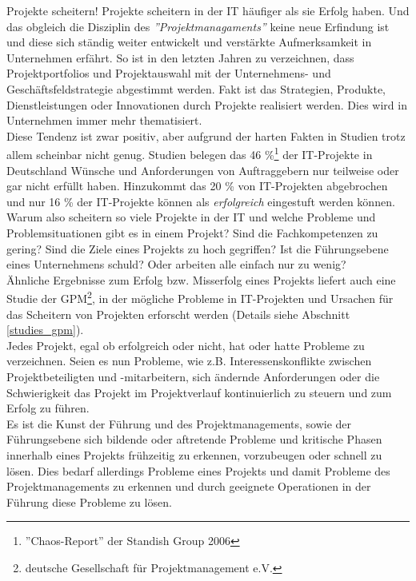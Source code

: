 \documentclass[12pt]{scrartcl}
\begin{document}
Projekte scheitern! Projekte scheitern in der IT häufiger als sie Erfolg haben. Und das obgleich die Disziplin des \textit{''Projektmanagaments''} keine neue Erfindung ist und diese sich ständig weiter entwickelt und verstärkte Aufmerksamkeit in Unternehmen erfährt. So ist in den letzten Jahren zu verzeichnen, dass Projektportfolios und Projektauswahl mit der Unternehmens- und Geschäftsfeldstrategie abgestimmt werden. Fakt ist das Strategien, Produkte, Dienstleistungen oder Innovationen durch Projekte realisiert werden. Dies wird in Unternehmen immer mehr thematisiert.\\
Diese Tendenz ist zwar positiv, aber aufgrund der harten Fakten in Studien trotz allem scheinbar nicht genug. Studien belegen das 46 \%\footnote{''Chaos-Report'' der Standish Group 2006} der IT-Projekte in Deutschland Wünsche und Anforderungen von Auftraggebern nur teilweise oder gar nicht erfüllt haben. Hinzukommt das 20 \% von IT-Projekten abgebrochen und nur 16 \% der IT-Projekte können als \textit{erfolgreich} eingestuft werden können. Warum also scheitern so viele Projekte in der IT und welche Probleme und Problemsituationen gibt es in einem Projekt? Sind die Fachkompetenzen zu gering? Sind die Ziele eines Projekts zu hoch gegriffen? Ist die Führungsebene eines Unternehmens schuld? Oder arbeiten alle einfach nur zu wenig?\\
Ähnliche Ergebnisse zum Erfolg bzw. Misserfolg eines Projekts liefert auch eine Studie der GPM\footnote{deutsche Gesellschaft für Projektmanagement e.V.}, in der mögliche Probleme in IT-Projekten und Ursachen für das Scheitern von Projekten erforscht werden (Details siehe Abschnitt \ref{studies_gpm}).\\ 
Jedes Projekt, egal ob erfolgreich oder nicht, hat oder hatte Probleme zu verzeichnen. Seien es nun Probleme, wie z.B. Interessenskonflikte zwischen Projektbeteiligten und -mitarbeitern, sich ändernde Anforderungen oder die Schwierigkeit das Projekt im Projektverlauf kontinuierlich zu steuern und zum Erfolg zu führen.\\
Es ist die Kunst der Führung und des Projektmanagements, sowie der Führungsebene sich bildende oder aftretende Probleme  und kritische Phasen innerhalb eines Projekts frühzeitig zu erkennen, vorzubeugen oder schnell zu lösen. Dies bedarf allerdings Probleme eines Projekts und damit Probleme des Projektmanagements zu erkennen und durch geeignete Operationen in der Führung diese Probleme zu lösen.

\pagebreak
\end{document}
